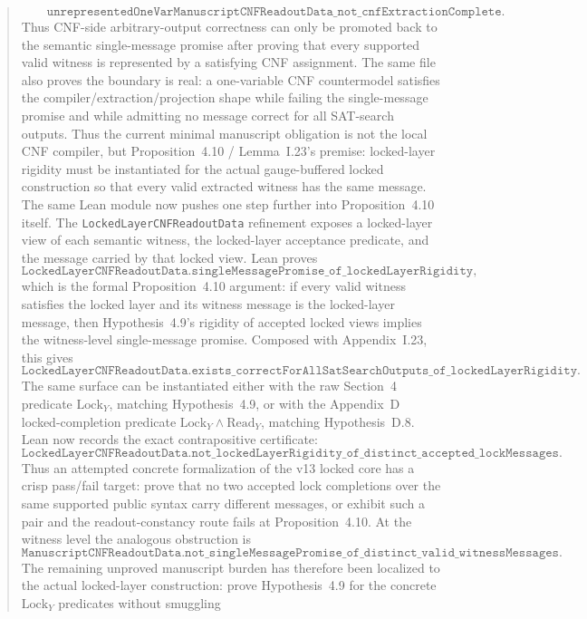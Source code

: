 \documentclass[11pt]{article}
\theoremstyle{remark}
\begin{document}
\begin{abstract}
\[  \qquad
  \texttt{unrepresentedOneVarManuscriptCNFReadoutData\_not\_cnfExtractionComplete}.
\]
Thus CNF-side arbitrary-output correctness can only be promoted back to the semantic
single-message promise after proving that every supported valid witness is represented by a
satisfying CNF assignment.
The same file also proves the boundary is real: a one-variable CNF countermodel satisfies the
compiler/extraction/projection shape while failing the single-message promise and while admitting no
message correct for all SAT-search outputs.  Thus the current minimal manuscript obligation is not
the local CNF compiler, but Proposition~4.10 / Lemma~I.23's premise: locked-layer rigidity must be
instantiated for the actual gauge-buffered locked construction so that every valid extracted witness
has the same message.
The same Lean module now pushes one step further into Proposition~4.10 itself.  The
\texttt{LockedLayerCNFReadoutData} refinement exposes a locked-layer view of each semantic witness,
the locked-layer acceptance predicate, and the message carried by that locked view.  Lean proves
\[
  \texttt{LockedLayerCNFReadoutData.singleMessagePromise\_of\_lockedLayerRigidity},
\]
which is the formal Proposition~4.10 argument: if every valid witness satisfies the locked layer and
its witness message is the locked-layer message, then Hypothesis~4.9's rigidity of accepted locked
views implies the witness-level single-message promise.  Composed with Appendix~I.23, this gives
\[
  \texttt{LockedLayerCNFReadoutData.exists\_correctForAllSatSearchOutputs\_of\_lockedLayerRigidity}.
\]
The same surface can be instantiated either with the raw Section~4 predicate
\(\mathrm{Lock}_Y\), matching Hypothesis~4.9, or with the Appendix~D locked-completion predicate
\(\mathrm{Lock}_Y \wedge \mathrm{Read}_Y\), matching Hypothesis~D.8.  Lean now records the exact
contrapositive certificate:
\[
  \texttt{LockedLayerCNFReadoutData.not\_lockedLayerRigidity\_of\_distinct\_accepted\_lockMessages}.
\]
Thus an attempted concrete formalization of the v13 locked core has a crisp pass/fail target: prove
that no two accepted lock completions over the same supported public syntax carry different messages,
or exhibit such a pair and the readout-constancy route fails at Proposition~4.10.  At the witness
level the analogous obstruction is
\[
  \texttt{ManuscriptCNFReadoutData.not\_singleMessagePromise\_of\_distinct\_valid\_witnessMessages}.
\]
The remaining unproved manuscript burden has therefore been localized to the actual locked-layer
construction: prove Hypothesis~4.9 for the concrete \(\mathrm{Lock}_Y\) predicates without smuggling

\end{abstract}
\end{document}
